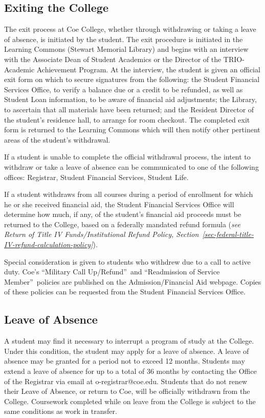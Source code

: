 \documentclass[
  letterpaper,
]{scrbook}
\begin{document}
\subsection{Exiting the College}\label{sec-official-withdrawal-process}

The exit process at Coe College, whether through withdrawing or taking a
leave of absence, is initiated by the student. The exit procedure is
initiated in the Learning Commons (Stewart Memorial Library) and begins
with an interview with the Associate Dean of Student Academics or the
Director of the TRIO-Academic Achievement Program. At the interview, the
student is given an official exit form on which to secure signatures
from the following: the Student Financial Services Office, to verify a
balance due or a credit to be refunded, as well as Student Loan
information, to be aware of financial aid adjustments; the Library, to
ascertain that all materials have been returned; and the Resident
Director of the student's residence hall, to arrange for room checkout.
The completed exit form is returned to the Learning Commons which will
then notify other pertinent areas of the student's withdrawal.

If a student is unable to complete the official withdrawal process, the
intent to withdraw or take a leave of absence can be communicated to one
of the following offices: Registrar, Student Financial Services, Student
Life.

If a student withdraws from all courses during a period of enrollment
for which he or she received financial aid, the Student Financial
Services Office will determine how much, if any, of the student's
financial aid proceeds must be returned to the College, based on a
federally mandated refund formula (\emph{see Return of Title IV
Funds/Institutional Refund Policy,
Section~\ref{sec-federal-title-IV-refund-calculation-policy}}).

Special consideration is given to students who withdrew due to a call to
active duty. Coe's ``Military Call Up/Refund''~and ``Readmission of
Service Member''~policies are published on the Admission/Financial Aid
webpage. Copies of these policies can be requested from the Student
Financial Services Office.

\subsection{Leave of Absence}\label{leave-of-absence}

A student may find it necessary to interrupt a program of study at the
College. Under this condition, the student may apply for a leave of
absence. A leave of absence may be granted for a period not to exceed 12
months. Students may extend a leave of absence for up to a total of 36
months by contacting the Office of the Registrar via email at
o-registrar@coe.edu. Students that do not renew their Leave of Absence,
or return to Coe, will be officially withdrawn from the College.
Coursework completed while on leave from the College is subject to the
same conditions as work in transfer.
\end{document}
